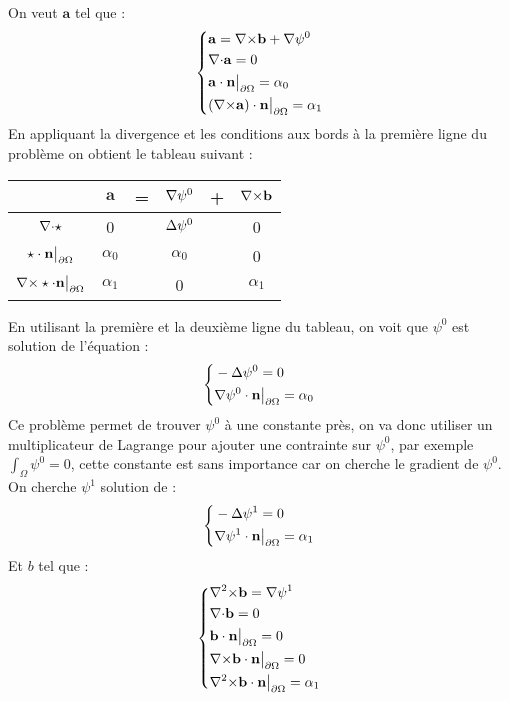 On veut $\mathbf{a}$ tel que :
\begin{equation}
\label{a}
\left\{
\begin{aligned}
&\mathbf{a}={\nabla\times} \mathbf{b}+{\nabla}\psi^0\\
&{\nabla\cdot} \mathbf{a} =0\\
&\mathbf{a}\cdot \mathbf{n}{\big\rvert_{\partial\Omega}} = \alpha_0\\
&({\nabla\times} \mathbf{a})\cdot \mathbf{n}{\big\rvert_{\partial\Omega}} = \alpha_1
\end{aligned}
\right.
\end{equation}
En appliquant la divergence et les conditions aux bords à la première ligne du problème on obtient le tableau suivant :
\begin{center}
\begin{tabular}{c|ccccc}
& $\mathbf{a}$ & = & ${\nabla}\psi^0$ & + & ${\nabla\times} \mathbf{b}$ \\ \hline
${\nabla\cdot}\star$ & 0 & & ${\Delta}\psi^0$ & & 0\\ \hline
$\star\cdot \mathbf{n}{\big\rvert_{\partial\Omega}}$ & $\alpha_0$ & & $\alpha_0$ & & 0\\ \hline
${\nabla\times}\star\cdot \mathbf{n}{\big\rvert_{\partial\Omega}}$ & $\alpha_1$ & & 0 & & $\alpha_1$
\end{tabular}
\end{center}
En utilisant la première et la deuxième ligne du tableau, on voit que $\psi^0$ est solution de l'équation :
\begin{equation}
\label{psi0}
\left\{
\begin{aligned}
&-{\Delta}\psi^0 = 0\\
&{\nabla}\psi^0\cdot \mathbf{n}{\big\rvert_{\partial\Omega}}=\alpha_0
\end{aligned}
\right.
\end{equation}
Ce problème permet de trouver $\psi^0$ à une constante près, on va donc utiliser un multiplicateur de Lagrange pour ajouter une contrainte sur $\psi^0$, par exemple $\int_\Omega \psi^0 = 0$, cette constante est sans importance car on cherche le gradient de $\psi^0$.\\

On cherche $\psi^1$ solution de :
\begin{equation}
\label{psi1}
\left\{
\begin{aligned}
&-{\Delta}\psi^1 = 0\\
&{\nabla}\psi^1\cdot \mathbf{n}{\big\rvert_{\partial\Omega}}=\alpha_1
\end{aligned}
\right.
\end{equation}
Et $b$ tel que :
\begin{equation}
\label{curlb}
\left\{
\begin{aligned}
&{\nabla^2\times} \mathbf{b} = {\nabla}\psi^1\\
&{\nabla\cdot} \mathbf{b} = 0\\
&\mathbf{b}\cdot \mathbf{n}{\big\rvert_{\partial\Omega}} = 0\\
&{\nabla\times} \mathbf{b}\cdot \mathbf{n}{\big\rvert_{\partial\Omega}} = 0\\
&{\nabla^2\times} \mathbf{b}\cdot \mathbf{n}{\big\rvert_{\partial\Omega}} = \alpha_1
\end{aligned}
\right.
\end{equation}

